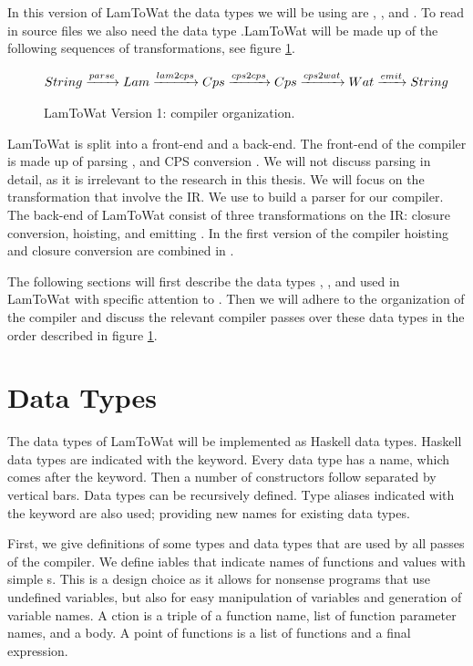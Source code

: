 In this version of LamToWat the data types we will be using are , , and . To read in source files we also need the data type .LamToWat will be made up of the following sequences of transformations, see figure \ref{fig:lam2watv1org}.

\begin{figure}
\begin{gather*}
  String \xrightarrow{parse} Lam \xrightarrow{lam2cps} Cps \xrightarrow{cps2cps} Cps \xrightarrow{cps2wat} Wat \xrightarrow{emit} String
\end{gather*}
\caption{LamToWat Version 1: compiler organization.}
\label{fig:lam2watv1org}
\end{figure}

LamToWat is split into a front-end and a back-end. The front-end of the compiler is made up of parsing , and CPS conversion . We will not discuss  parsing in detail, as it is irrelevant to the research in this thesis. We will focus on the transformation that involve the IR. We use  to build a parser for our compiler. The back-end of LamToWat consist of three transformations on the IR: closure conversion, hoisting, and emitting . In the first version of the compiler hoisting and closure conversion are combined in .

The following sections will first describe the data types , , and  used in LamToWat with specific attention to . Then we will adhere to the organization of the compiler and discuss the relevant compiler passes over these data types in the order described in figure \ref{fig:lam2watv1org}.

\section{\label{section:datatypes}Data Types}
The data types of LamToWat will be implemented as Haskell data types. Haskell data types are indicated with the  keyword. Every data type has a name, which comes after the keyword. Then a number of constructors follow separated by vertical bars. Data types can be recursively defined. Type aliases indicated with the  keyword are also used; providing new names for existing data types.

First, we give definitions of some types and data types that are used by all passes of the compiler. We define iables that indicate names of functions and values with simple s. This is a design choice as it allows for nonsense programs that use undefined variables, but also for easy manipulation of variables and generation of variable names. A ction is a triple of a function name, list of function parameter names, and a body. A point of functions is a list of functions and a final expression.


